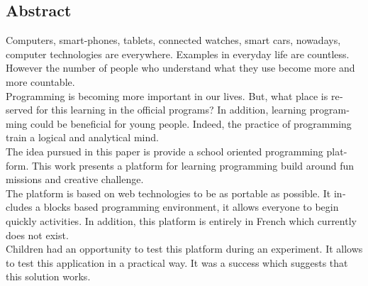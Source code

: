 \begin{otherlanguage}{english}
\section*{Abstract}
Computers, smart-phones, tablets, connected watches, smart cars, nowadays, computer technologies are everywhere. Examples in everyday life are countless. However the number of people who understand what they use become more and more countable. \\

Programming is becoming more important in our lives. But, what place is reserved for this learning in the official programs? In addition, learning programming could be beneficial for young people. Indeed, the practice of programming train a logical and analytical mind. \\

The idea pursued in this paper is provide a school oriented programming platform. This work presents a platform for learning programming build around fun missions and creative challenge. \\

The platform is based on web technologies to be as portable as possible. It includes a blocks based programming environment, it allows everyone to begin quickly activities. In addition, this platform is entirely in French which currently does not exist. \\

Children had an opportunity to test this platform during an experiment. It allows to test this application in a practical way. It was a success which suggests that this solution works.
\end{otherlanguage}
